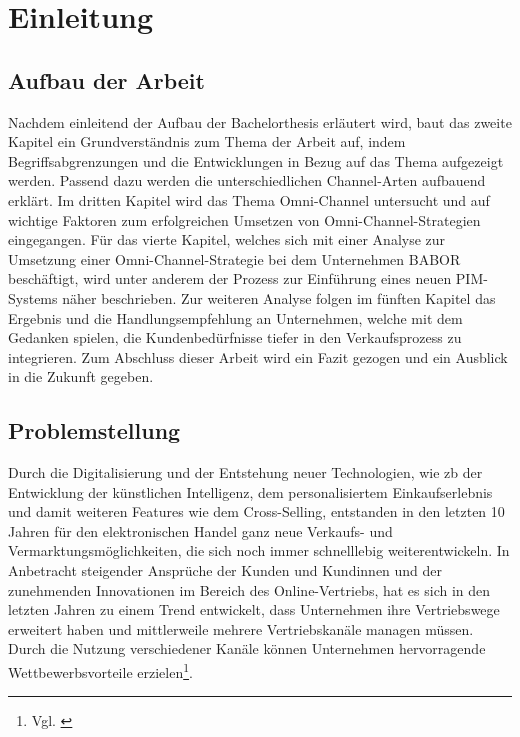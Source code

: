\section{Einleitung}\label{einleitung}

\subsection{Aufbau der Arbeit}\label{aufbau}
Nachdem einleitend der Aufbau der Bachelorthesis erläutert wird, baut das zweite Kapitel ein Grundverständnis zum Thema der Arbeit auf, indem Begriffsabgrenzungen und die Entwicklungen in Bezug auf das Thema aufgezeigt werden. Passend dazu werden die unterschiedlichen Channel-Arten aufbauend erklärt.
\newline
Im dritten Kapitel wird das Thema Omni-Channel untersucht und auf wichtige Faktoren zum erfolgreichen Umsetzen von Omni-Channel-Strategien eingegangen.
\newline
Für das vierte Kapitel, welches sich mit einer Analyse zur Umsetzung einer Omni-Channel-Strategie bei dem Unternehmen BABOR beschäftigt, wird unter anderem der Prozess zur Einführung eines neuen PIM-Systems näher beschrieben.
\newline
Zur weiteren Analyse folgen im fünften Kapitel das Ergebnis und die Handlungsempfehlung an Unternehmen, welche mit dem Gedanken spielen, die Kundenbedürfnisse tiefer in den Verkaufsprozess zu integrieren.
\newline
Zum Abschluss dieser Arbeit wird ein Fazit gezogen und ein Ausblick in die Zukunft gegeben.

\subsection{Problemstellung}\label{problemstellung}
Durch die Digitalisierung und der Entstehung neuer Technologien, wie \ac{zb} der Entwicklung der künstlichen Intelligenz, dem personalisiertem Einkaufserlebnis und damit weiteren Features wie dem Cross-Selling, entstanden in den letzten 10 Jahren für den elektronischen Handel ganz neue Verkaufs- und Vermarktungsmöglichkeiten, die sich noch immer schnelllebig weiterentwickeln. In Anbetracht steigender Ansprüche der Kunden und Kundinnen und der zunehmenden Innovationen im Bereich des Online-Vertriebs, hat es sich in den letzten Jahren zu einem Trend  entwickelt, dass Unternehmen ihre Vertriebswege erweitert haben und mittlerweile mehrere Vertriebskanäle managen müssen. Durch die Nutzung verschiedener Kanäle können Unternehmen hervorragende Wettbewerbsvorteile erzielen\footnote {Vgl. \autocite [S. 201] {Wirtz2013}}.
\newline

